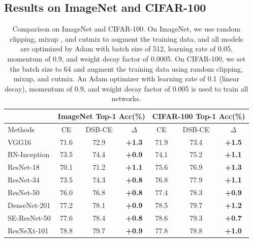 \documentclass[10pt]{article} %
\begin{document}
\subsection{Results on ImageNet and CIFAR-100\label{5.2}}
\begin{table}[h]
\small
\renewcommand\arraystretch{1}
\vskip -0.18in
\setlength{\tabcolsep}{17.7pt} %
\caption{Comparison on ImageNet and CIFAR-100. On ImageNet, we use random clipping, mixup \cite {paper76}, and cutmix \cite {paper77} to augment the training data, and all models are optimized by Adam with batch size of 512, learning rate of 0.05, momentum of 0.9, and weight decay factor of 0.0005. On CIFAR-100, we set the batch size to 64 and augment the training data using random clipping, mixup, and cutmix. An Adam optimizer with learning rate of 0.1 (linear decay), momentum of 0.9, and weight decay factor of 0.005 is used to train all networks.}
\vskip 0.1in
\label{table3}
\centering  
\begin{tabular}{l|ccc|ccc}
\hline  \toprule
   & \multicolumn{3}{c|}{ImageNet Top-1 Acc(\%)}  &  \multicolumn{3}{c}{CIFAR-100 Top-1 Acc(\%)}  \\ \hline
Methods & CE  & DSB-CE & $\Delta$ & CE & DSB-CE & $\Delta$ \\ \hline
VGG16 \cite {paper9}&  71.6 & 72.9 & \textcolor[RGB]{0,201,87}{\textbf{+1.3}} & 71.9 & 73.4 & \textcolor[RGB]{0,201,87}{\textbf{+1.5}} \\
BN-Inception \cite{paper78} &  73.5 & 74.4 & \textcolor[RGB]{0,201,87}{\textbf{+0.9}} & 74.1 & 75.2 & \textcolor[RGB]{0,201,87}{\textbf{+1.1}} \\
ResNet-18 &  70.1 & 71.2 & \textcolor[RGB]{0,201,87}{\textbf{+1.1}}  &75.6   & 76.9 & \textcolor[RGB]{0,201,87}{\textbf{+1.3}}  \\
ResNet-34 &  73.5 & 74.3 & \textcolor[RGB]{0,201,87}{\textbf{+0.8}}  & 76.8 & 77.9 & \textcolor[RGB]{0,201,87}{\textbf{+1.1}}  \\
ResNet-50 &  76.0 & 76.8 & \textcolor[RGB]{0,201,87}{\textbf{+0.8}}  & 77.4 & 78.3 & \textcolor[RGB]{0,201,87}{\textbf{+0.9}}  \\
DenseNet-201 \cite {paper79} &  77.2 & 78.1 & \textcolor[RGB]{0,201,87}{\textbf{+0.9}}  & 78.5 & 79.7 & \textcolor[RGB]{0,201,87}{\textbf{+1.2}}  \\
SE-ResNet-50 \cite {paper80} &  77.6 & 78.4 & \textcolor[RGB]{0,201,87}{\textbf{+0.8}}  & 78.6 & 79.3 & \textcolor[RGB]{0,201,87}{\textbf{+0.7}}  \\
ResNeXt-101 \cite {paper81} &  78.8 & 79.7 & \textcolor[RGB]{0,201,87}{\textbf{+0.9}}  & 77.8  & 78.8 & \textcolor[RGB]{0,201,87}{\textbf{+1.0}}  \\
\bottomrule \hline
\end{tabular}
\vskip -0.05in
\end{table}
\end{document}
